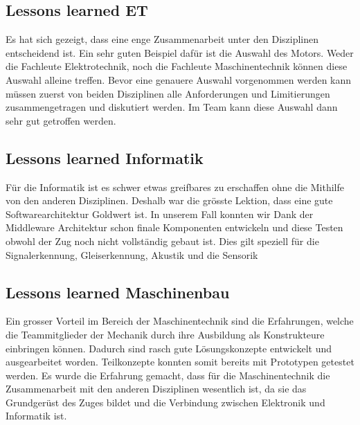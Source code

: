 \documentclass[../../main.tex]{subfiles}
\begin{document}
\subsection{Lessons learned ET}
Es hat sich gezeigt, dass eine enge Zusammenarbeit unter den Disziplinen entscheidend ist. Ein sehr guten Beispiel dafür ist die Auswahl des Motors. Weder die Fachleute Elektrotechnik, noch die Fachleute Maschinentechnik können diese Auswahl alleine treffen. Bevor eine genauere Auswahl vorgenommen werden kann müssen zuerst von beiden Disziplinen alle Anforderungen und Limitierungen zusammengetragen und diskutiert werden. Im Team kann diese Auswahl dann sehr gut getroffen werden.

\subsection{Lessons learned Informatik}
Für die Informatik ist es schwer etwas greifbares zu erschaffen ohne die Mithilfe von den anderen Disziplinen. Deshalb
war die grösste Lektion, dass eine gute Softwarearchitektur Goldwert ist. In unserem Fall konnten wir Dank der
Middleware Architektur schon finale Komponenten entwickeln und diese Testen obwohl der Zug noch nicht vollständig gebaut
ist. Dies gilt speziell für die Signalerkennung, Gleiserkennung, Akustik und die Sensorik

\subsection{Lessons learned Maschinenbau}
Ein grosser Vorteil im Bereich der Maschinentechnik sind die Erfahrungen, welche die Teammitglieder der Mechanik durch ihre Ausbildung als Konstrukteure einbringen können. Dadurch sind rasch gute Lösungskonzepte entwickelt und ausgearbeitet worden. Teilkonzepte konnten somit bereits mit Prototypen getestet werden. Es wurde die Erfahrung gemacht, dass für die Maschinentechnik die Zusammenarbeit mit den anderen Disziplinen wesentlich ist, da sie das Grundgerüst des Zuges bildet und die Verbindung zwischen Elektronik und Informatik ist.
\end{document}
